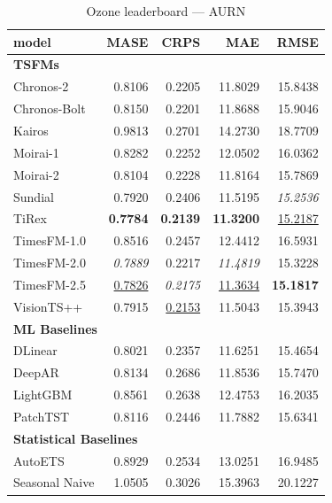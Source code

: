 \begin{table}[H]
\caption{Ozone leaderboard --- AURN}
\centering
\begin{small}
\begin{tabular}{lrrrr}
\toprule
model & MASE & CRPS & MAE & RMSE \\
\midrule
\multicolumn{5}{l}{\textbf{TSFMs}} \\
Chronos-2 & 0.8106 & 0.2205 & 11.8029 & 15.8438 \\
Chronos-Bolt & 0.8150 & 0.2201 & 11.8688 & 15.9046 \\
Kairos & 0.9813 & 0.2701 & 14.2730 & 18.7709 \\
Moirai-1 & 0.8282 & 0.2252 & 12.0502 & 16.0362 \\
Moirai-2 & 0.8104 & 0.2228 & 11.8164 & 15.7869 \\
Sundial & 0.7920 & 0.2406 & 11.5195 & \textit{15.2536} \\
TiRex & \textbf{0.7784} & \textbf{0.2139} & \textbf{11.3200} & \underline{15.2187} \\
TimesFM-1.0 & 0.8516 & 0.2457 & 12.4412 & 16.5931 \\
TimesFM-2.0 & \textit{0.7889} & 0.2217 & \textit{11.4819} & 15.3228 \\
TimesFM-2.5 & \underline{0.7826} & \textit{0.2175} & \underline{11.3634} & \textbf{15.1817} \\
VisionTS++ & 0.7915 & \underline{0.2153} & 11.5043 & 15.3943 \\
\midrule
\multicolumn{5}{l}{\textbf{ML Baselines}} \\
DLinear & 0.8021 & 0.2357 & 11.6251 & 15.4654 \\
DeepAR & 0.8134 & 0.2686 & 11.8536 & 15.7470 \\
LightGBM & 0.8561 & 0.2638 & 12.4753 & 16.2035 \\
PatchTST & 0.8116 & 0.2446 & 11.7882 & 15.6341 \\
\midrule
\multicolumn{5}{l}{\textbf{Statistical Baselines}} \\
AutoETS & 0.8929 & 0.2534 & 13.0251 & 16.9485 \\
Seasonal Naive & 1.0505 & 0.3026 & 15.3963 & 20.1227 \\
\bottomrule
\end{tabular}
\end{small}
\end{table}